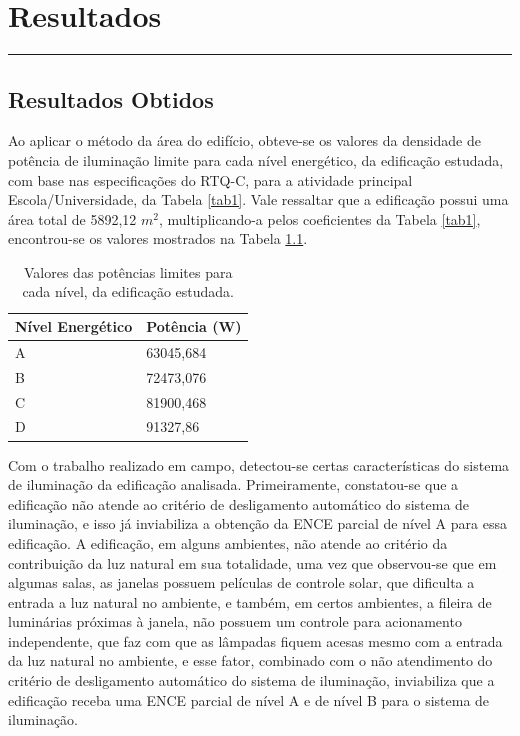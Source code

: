 \chapter{Resultados}\label{chp:resultados}
\vspace{-1.5cm}
\noindent\rule{\columnwidth}{1.2mm}
\vspace{0.1cm}

\section{Resultados Obtidos}

Ao aplicar o método da área do edifício, obteve-se os valores da densidade de potência de iluminação limite para cada nível energético, da edificação estudada, com base nas especificações do RTQ-C, para a atividade principal Escola/Universidade, da Tabela \ref{tab1}. Vale ressaltar que a edificação possui uma área total de 5892,12 $m^2$, multiplicando-a pelos coeficientes da Tabela \ref{tab1}, encontrou-se os valores mostrados na Tabela \ref{tab_dpil}.

\begin{table}[H]
\centering
\caption{Valores das potências limites para cada nível, da edificação estudada.}
\label{tab_dpil}
\begin{tabular}{ll}\hline
Nível Energético & Potência (W) \\\hline
A                & 63045,684        \\
B                & 72473,076        \\
C                & 81900,468        \\
D                & 91327,86   \\\hline     
\end{tabular}
\end{table}

Com o trabalho realizado em campo, detectou-se certas características do sistema de iluminação da edificação analisada. Primeiramente, constatou-se que a edificação não atende ao critério de desligamento automático do sistema de iluminação, e isso já inviabiliza a obtenção da ENCE parcial de nível A para essa edificação. A edificação, em alguns ambientes, não atende ao critério da contribuição da luz natural em sua totalidade, uma vez que observou-se que em algumas salas, as janelas possuem películas de controle solar, que dificulta a entrada a luz natural no ambiente, e também, em certos ambientes, a fileira de luminárias próximas à janela, não possuem um controle para acionamento independente, que faz com que as lâmpadas fiquem acesas mesmo com a entrada da luz natural no ambiente, e esse fator, combinado com o não atendimento do critério de desligamento automático do sistema de iluminação, inviabiliza que a edificação receba uma ENCE parcial de nível A e de nível B para o sistema de iluminação.

